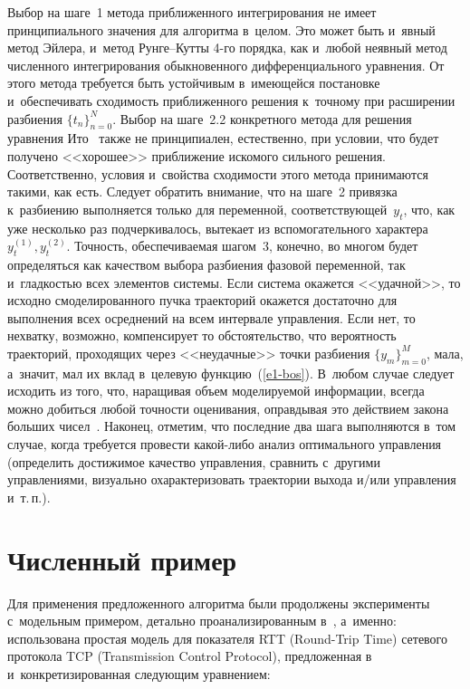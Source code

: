 \begin{multicols}{2}
     Выбор на шаге~1 метода приближенного интегрирования не имеет 
принципиального значения для алгоритма в~целом. Это может быть и~явный 
метод Эйлера, и~метод Рун\-ге--Кут\-ты 4-го порядка, как и~любой неявный 
метод численного интегрирования обыкновенного дифференциального 
уравнения. От этого метода требуется быть устойчивым в~имеющейся 
постановке и~обеспечивать сходимость приближенного решения к~точному 
при расширении разбиения $\{t_n\}^N_{n=0}$. Выбор на шаге~2.2 
конкретного метода для решения уравнения Ито~\cite{6-bos} также не 
принципиален, естественно, при условии, что будет получено <<хорошее>> 
приближение искомого сильного решения. Соответственно, условия 
и~свойства сходимости этого метода принимаются такими, как есть. Следует 
обратить внимание, что на шаге~2 привязка к~разбиению выполняется только 
для переменной, соответствующей~$y_t$, что, как уже несколько раз 
подчеркивалось, вытекает из вспомогательного характера $y_t^{(1)}, 
y_t^{(2)}$. Точность, обеспечиваемая шагом~3, конечно, во многом будет 
определяться как качеством выбора разбиения фазовой переменной, так 
и~гладкостью всех элементов системы. Если система окажется <<удачной>>, 
то исходно смоделированного пучка траекторий окажется достаточно для 
выполнения всех осреднений на всем интервале управления. Если нет, то 
нехватку, возможно, компенсирует то обстоятельство, что вероятность 
траекторий, проходящих через <<неудачные>> точки разбиения 
$\{y_m\}^M_{m=0}$, мала, а~значит, мал их вклад в~целевую 
функцию~(\ref{e1-bos}). В~любом случае следует исходить из того, что, 
наращивая объем моделируемой информации, всегда можно добиться любой 
точности оценивания, оправдывая это действием закона больших 
чисел~\cite{7-bos}. Наконец, отметим, что последние два шага выполняются в~том случае, когда требуется провести ка\-кой-ли\-бо анализ оптимального 
управления (определить достижимое качество управления, сравнить 
с~другими управлениями, визуально охарактеризовать траектории выхода 
и/или управ\-ле\-ния и~т.\,п.).

\vspace*{-9pt}

\section{Численный пример}

\vspace*{-2pt}
     
     Для применения предложенного алгоритма были продолжены 
эксперименты с~модельным примером, детально проанализированным 
в~\cite{2-bos}, а~именно: использована простая модель для показателя RTT 
(Round-Trip Time) сетевого протокола TCP (Transmission Control Protocol), 
предложенная в~\cite{8-bos} и~конкретизированная следующим уравнением:


\end{multicols}
